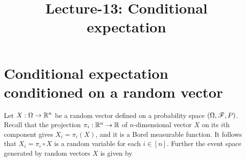 \documentclass[letterpaper,10pt,english]{article}
\title{Lecture-13: Conditional expectation}
\author{}
\begin{document}
\maketitle


\section{Conditional expectation conditioned on a random  vector}

Let $X: \Omega \to \mathbb{R}^n$ be a random vector defined on a probability space $(\Omega, \mathscr{F}, P)$. 
Recall that the projection $\pi_i: \mathbb{R}^n \to \mathbb{R}$ of $n$-dimensional vector $X$ on its $i$th component gives $X_i = \pi_i(X)$, 
and it is a Borel measurable function. 
It follows that $X_i = \pi_i\circ X$ is a random variable for each $i \in [n]$. 
Further the event space generated by random vectors $X$ is given by 
\end{document}
